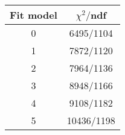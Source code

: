 \begin{tabular}{c|c}
Fit model & $\chi^2/$ndf \\
\hline
0 & 6495/1104\\
1 & 7872/1120\\
2 & 7964/1136\\
3 & 8948/1166\\
4 & 9108/1182\\
5 & 10436/1198\\
\end{tabular}
